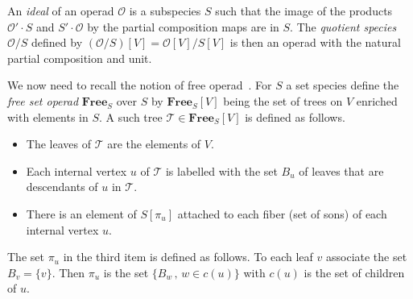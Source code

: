 \documentclass[a4paper]{article}
\DeclareMathOperator{\op}{\mathcal{O}}
\theoremstyle{definition}
\newtheorem{definition}{Definition}
\newcommand{\Operad}{\mathcal{O}}
\newcommand{\FreeOp}{\mathbf{Free}}
\begin{document}



An \textit{ideal} of an operad $\Operad$ is a subspecies $S$ such that the image of the
products $\Operad'\cdot S$ and $S'\cdot\Operad$ by the partial composition maps are in $S$.
The \textit{quotient species} $\Operad/ S$ defined by $(\Operad/S)[V] = \Operad[V]/S[V]$ is
then an operad with the natural partial composition and unit.

We now need to recall the notion of free operad~\cite{Men15}. For $S$ a set species define the 
{\em free set operad} $\FreeOp_S$ over $S$ by $\FreeOp_S[V]$ being the set of 
trees on $V$ enriched with elements in $S$. A such tree $\mathcal{T}\in \FreeOp_S[V]$ 
is defined as follows.
\begin{itemize}
	\item The leaves of $\mathcal{T}$ are the elements of $V$.
	\item Each internal vertex $u$ of $\mathcal{T}$ is labelled with the set $B_u$
	of leaves that are descendants of $u$ in $\mathcal{T}$.
	\item There is an element of $S[\pi_u]$ attached to each fiber (set of sons) of each
	internal vertex $u$.
\end{itemize}
\noindent The set $\pi_u$ in the third item is defined as follows. To each leaf $v$ associate 
the set $B_v=\{v\}$. Then $\pi_u$ is the set $\{B_w\,,\,w\in c(u)\}$ with $c(u)$ is the set
of children of $u$.
\end{document}
